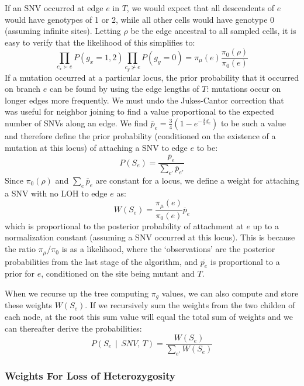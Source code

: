 \documentclass[../../main.tex]{subfiles}
\begin{document}
If an SNV occurred at edge $e$ in $T$, we would expect that all descendents of $e$ would have genotypes of 1 or 2, while all other cells would have genotype 0 (assuming infinite sites).
Letting $\rho$ be the edge ancestral to all sampled cells, it is easy to verify that the likelihood of this simplifies to:
\begin{equation*}
    \prod_{c_x\succ e}P(g_x =1,2)\prod_{c_y\nsucc e} P(g_y = 0) = \pi_\mu(e)\frac{\pi_0(\rho)}{\pi_0(e)}
\end{equation*}
If a mutation occurred at a particular locus, the prior probability that it occurred on branch $e$ can be found by using the edge lengths of $T$: mutations occur on longer edges more frequently.
We must undo the Jukes-Cantor correction that was useful for neighbor joining to find a value proportional to the expected number of SNVs along an edge.
We find $\overline{p}_e = \frac{3}{4}\left(1-e^{-\frac{4}{3}d_e}\right)$ to be such a value and therefore define the prior probability (conditioned on the existence of a mutation at this locus) of attaching a SNV to edge $e$ to be:
\begin{equation*}
    P(S_e) = \frac{\overline{p}_e}{\sum_{e'}\overline{p}_{e'}}
\end{equation*}
Since $\pi_0(\rho)$ and $\sum_{e}\overline{p}_{e}$ are constant for a locus, we define a weight for attaching a SNV with no LOH to edge $e$ as:
\begin{equation*}
    W(S_e) = \frac{\pi_\mu(e)}{\pi_0(e)} \overline{p}_e
\end{equation*}
which is proportional to the posterior probability of attachment at $e$ up to a normalization constant (assuming a SNV occurred at this locus).
This is because the ratio $\pi_\mu/\pi_0$ is as a likelihood, where the `observations' are the posterior probabilities from the last stage of the algorithm, and $\overline{p_e}$ is proportional to a prior for $e$, conditioned on the site being mutant and $T$.

When we recurse up the tree computing $\pi_g$ values, we can also compute and store these weights $W(S_e)$.
If we recursively sum the weights from the two childen of each node, at the root this sum value will equal the total sum of weights and we can thereafter derive the probabilities:
\begin{equation} \label{eq:SNVattachP}
    P(S_e\,\mid\,SNV,\,T) = \frac{W(S_e)}{\sum_{e'}W(S_e)}
\end{equation}


\subsubsection*{Weights For Loss of Heterozygosity}
\end{document}
